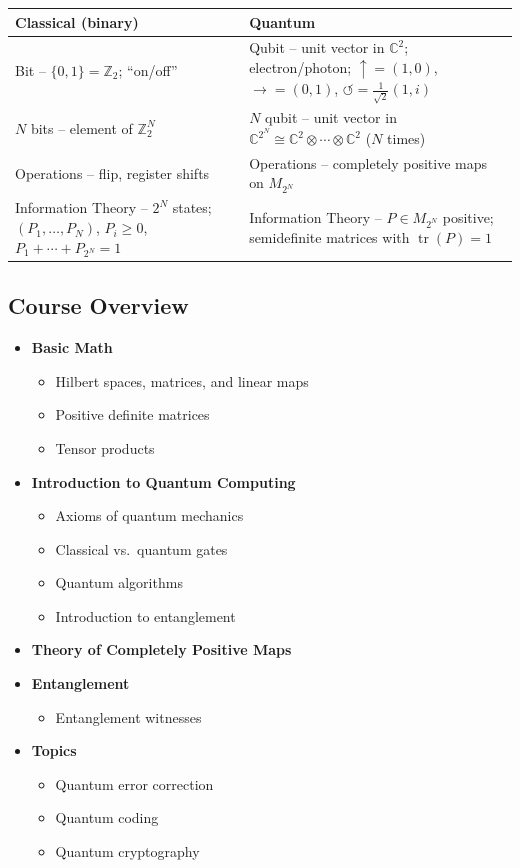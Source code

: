 \documentclass[12pt]{article}
\theoremstyle{definition}
\DeclareMathOperator{\tr}{tr}
\newcommand{\C}{\mathbb{C}}
\newcommand{\Z}{\mathbb{Z}}
\begin{document}
\begin{center}
\renewcommand{\arraystretch}{1.2}
\begin{tabular}{|p{}|p{}|}
\hline
\textbf{Classical (binary)} & \textbf{Quantum} \\
\hline
Bit -- $\{0,1\} = \Z_2$; ``on/off'' &
Qubit -- unit vector in $\C^2$; electron/photon; $\uparrow=(1,0)$,
$\rightarrow=(0,1)$, $\circlearrowleft=\frac{1}{\sqrt{2}}(1,i)$ \\
\hline
$N$ bits -- element
of $\Z_2^N$ &
$N$ qubit -- unit vector in
$\C^{2^N} \cong \C^2 \otimes \cdots \otimes \C^2$ ($N$ times) \\
\hline
Operations -- flip, register shifts &
Operations -- completely positive maps
on $M_{2^N}$ \\
\hline
Information Theory -- $2^N$ states;
$(P_1,\ldots,P_N)$, $P_i \geq 0$,
$P_1+\cdots+P_{2^N}=1$ &
Information Theory -- $P \in M_{2^N}$
positive; semidefinite matrices
with $\tr(P)=1$ \\
\hline
\end{tabular}
\renewcommand{\arraystretch}{1}
\end{center}

\subsection{Course Overview}

\begin{itemize}
\item[\textbf{I.}] \textbf{Basic Math}
\begin{itemize}
\item Hilbert spaces, matrices, and linear maps
\item Positive definite matrices
\item Tensor products
\end{itemize}
\item[\textbf{II.}] \textbf{Introduction to Quantum Computing}
\begin{itemize}
\item Axioms of quantum mechanics
\item Classical vs.\ quantum gates
\item Quantum algorithms
\item Introduction to entanglement
\end{itemize}
\item[\textbf{III.}] \textbf{Theory of Completely Positive Maps}
\item[\textbf{IV.}] \textbf{Entanglement}
\begin{itemize}
\item Entanglement witnesses
\end{itemize}
\item[\textbf{V.}] \textbf{Topics}
\begin{itemize}
\item Quantum error correction
\item Quantum coding
\item Quantum cryptography
\end{itemize}
\end{itemize}
\end{document}
